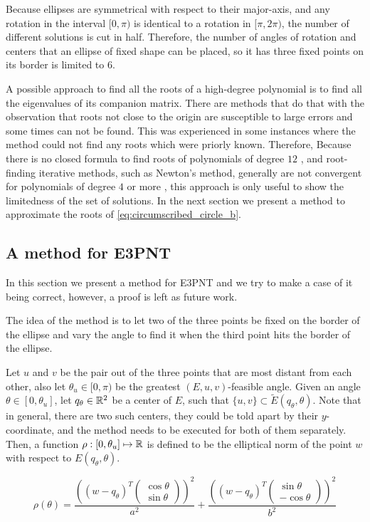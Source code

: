 Because ellipses are symmetrical with respect to their major-axis, and any rotation in the interval $[0, \pi)$ is identical to a rotation in $[\pi, 2\pi)$, the number of different solutions is cut in half.
Therefore, the number of angles of rotation and centers that an ellipse of fixed shape can be placed, so it has three fixed points on its border is limited to $6$.

A possible approach to find all the roots of a high-degree polynomial is to find all the eigenvalues of its companion matrix\cite{horn}. There are methods that do that with the observation that roots not close to the origin are susceptible to large errors and some times can not be found. This was experienced in some instances where the method could not find any roots which were priorly known.
Therefore, Because there is no closed formula to find roots of polynomials of degree $12$ \cite{skopenkov2015}, and root-finding iterative methods, such as Newton's method, generally are not convergent for polynomials of degree $4$ or more \cite{mc1}, this approach is only useful to show the limitedness of the set of solutions. In the next section we present a method to approximate the roots of \autoref{eq:circumscribed_circle_b}.

\subsection{A method for E3PNT}

In this section we present a method for E3PNT and we try to make a case of it being correct, however, a proof is left as future work.

The idea of the method is to let two of the three points be fixed on the border of the ellipse and vary the angle to find it when the third point hits the border of the ellipse.

Let $u$ and $v$ be the pair out of the three points that are most distant from each other, also let $\theta_u \in [0, \pi)$ be the greatest $(E, u, v)$-feasible angle. Given an angle $\theta \in [0, \theta_u]$, let $q_\theta\in\mathbb{R}^2$ be a center of $E$, such that $\{u, v\} \subset \tilde{E}(q_\theta, \theta)$. Note that in general, there are two such centers, they could be told apart by their $y$-coordinate, and the method needs to be executed for both of them separately.
Then, a function $\rho : [0, \theta_u] \mapsto \mathbb{R}$ is defined to be the elliptical norm of the point $w$ with respect to $E(q_\theta, \theta)$.

\begin{equation}\label{eq:rho}
\rho(\theta) = \dfrac{\left((w-q_\theta)^T\left(\begin{array}{c}
	\cos{\theta}\\
	\sin{\theta}
	\end{array}\right)\right)^2}{a^2}+
\dfrac{\left((w-q_\theta)^T\left(\begin{array}{c}
	\sin{\theta}\\
	-\cos{\theta}
	\end{array}\right)\right)^2}{b^2}
\end{equation}


